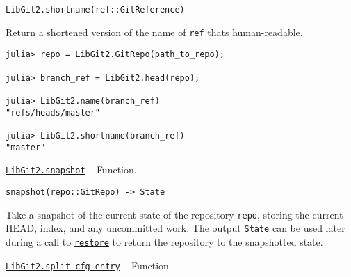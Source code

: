 \begin{adjustwidth}{2em}{0pt}


\begin{verbatim}
LibGit2.shortname(ref::GitReference)
\end{verbatim}

Return a shortened version of the name of \texttt{ref} that{\textquotesingle}s {\textquotedbl}human-readable{\textquotedbl}.


\begin{verbatim}
julia> repo = LibGit2.GitRepo(path_to_repo);

julia> branch_ref = LibGit2.head(repo);

julia> LibGit2.name(branch_ref)
"refs/heads/master"

julia> LibGit2.shortname(branch_ref)
"master"
\end{verbatim}



\end{adjustwidth}
\hypertarget{5664620894068288269}{}
\hyperlink{5664620894068288269}{\texttt{LibGit2.snapshot}}  -- {Function.}

\begin{adjustwidth}{2em}{0pt}


\begin{verbatim}
snapshot(repo::GitRepo) -> State
\end{verbatim}

Take a snapshot of the current state of the repository \texttt{repo}, storing the current HEAD, index, and any uncommitted work. The output \texttt{State} can be used later during a call to \hyperlink{1068934750891016732}{\texttt{restore}} to return the repository to the snapshotted state.



\end{adjustwidth}
\hypertarget{709196314204873648}{}
\hyperlink{709196314204873648}{\texttt{LibGit2.split\_cfg\_entry}}  -- {Function.}

